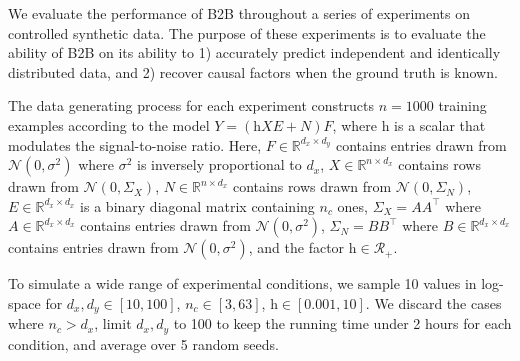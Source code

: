 We evaluate the performance of B2B throughout a series of experiments on
controlled synthetic data.
%
The purpose of these experiments is to evaluate the ability of B2B on its
ability to 1) accurately predict independent and identically distributed data,
and 2) recover causal factors when the ground truth is known.

The data generating process for each experiment constructs $n=1000$ training examples
according to the model $Y = (\text{h} XE + N)F$, where $\text{h}$ is a
scalar that modulates the signal-to-noise ratio.
%
Here,
    $F \in \mathbb{R}^{d_x \times d_y}$ contains entries drawn from
$\mathcal{N}(0, \sigma^2)$ where $\sigma^2$ is inversely proportional to $d_x$,
$X \in \mathbb{R}^{n \times d_x}$ contains rows
drawn from $\mathcal{N}(0, \Sigma_X)$, $N \in \mathbb{R}^{n \times d_x}$
contains rows drawn from $\mathcal{N}(0, \Sigma_N)$, $E \in \mathbb{R}^{d_x
\times d_x}$ is a binary diagonal matrix containing $n_c$ ones, $\Sigma_X =
AA^\top$ where $A \in \mathbb{R}^{d_x \times d_x}$ contains entries drawn from
$\mathcal{N}(0, \sigma^2)$, $\Sigma_N = BB^\top$ where $B \in \mathbb{R}^{d_x
\times d_x}$ contains entries drawn from $\mathcal{N}(0, \sigma^2)$, and the
factor $\text{h} \in \mathcal{R}_+$.

To simulate a wide range of experimental conditions, we sample 10 values in log-space for $d_x, d_y \in \left[ 10, 100 \right]$, $n_c \in \left[ 3, 63 \right]$,
$\text{h} \in \left[ 0.001, 10 \right]$. We discard the cases where $n_c > d_x$, limit $d_x, d_y$ to 100 to keep the running time under 2 hours for each condition, and average over 5 random seeds.
%

